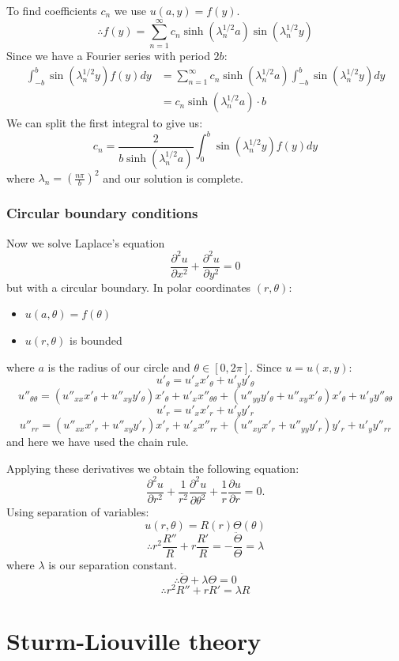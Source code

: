 \documentclass{article}
\begin{document}
To find coefficients $c_n$ we use $u(a,y)=f(y)$.
$$\therefore f(y)=\sum_{n=1}^{\infty}c_n\sinh(\lambda_n^{1/2} a)
\sin(\lambda_n^{1/2} y)$$
Since we have a Fourier series with period $2b$:
\begin{align*}
    \int_{-b}^{b}\sin(\lambda_n^{1/2} y)f(y)dy
    &=\sum_{n=1}^{\infty}c_n\sinh(\lambda_n^{1/2} a)
    \int_{-b}^{b}\sin(\lambda_n^{1/2} y)dy \\
    &=c_n\sinh(\lambda_n^{1/2} a)\cdot b
\end{align*}
We can split the first integral to give us:
$$c_n=\frac{2}{b\sinh(\lambda_n^{1/2} a)}
\int_{0}^{b}\sin(\lambda_n^{1/2} y)f(y)dy$$
where $\lambda_n=\left(\frac{n\pi}{b}\right)^2$
and our solution is complete.

\subsubsection{Circular boundary conditions}
Now we solve Laplace's equation
$$\frac{\partial^2 u}{\partial x^2}+\frac{\partial^2 u}{\partial y^2}=0$$
but with a circular boundary. In polar coordinates $(r,\theta)$:
\begin{itemize}
    \item $u(a,\theta)=f(\theta)$
    \item $u(r,\theta)$ is bounded
\end{itemize}
where $a$ is the radius of our circle and $\theta\in[0,2\pi]$. Since $u=u(x,y)$:
$$u'_{\theta}=u'_x x'_{\theta}+u'_y y'_{\theta}$$
$$u''_{\theta\theta}=(u''_{xx}x'_{\theta}+u''_{xy}y'_{\theta})x'_{\theta}
+u'_x x''_{\theta\theta}+(u''_{yy}y'_{\theta}+u''_{xy}x'_{\theta})x'_{\theta}+u'_y y''_{\theta\theta}$$
$$u'_r=u'_x x'_r+u'_y y'_r$$
$$u''_{rr}=(u''_{xx}x'_r+u''_{xy}y'_r)x'_r
+u'_x x''_{rr}+(u''_{xy}x'_r+u''_{yy}y'_r)y'_r+u'_y y''_{rr}$$
and here we have used the chain rule.

\newpage

Applying these derivatives we obtain the following equation:
$$\frac{\partial^2 u}{\partial r^2}+\frac{1}{r^2}\frac{\partial^2 u}{\partial\theta^2}
+\frac{1}{r}\frac{\partial u}{\partial r}=0.$$
Using separation of variables:
$$u(r,\theta)=R(r)\Theta(\theta)$$
$$\therefore r^2\frac{R''}{R}+r\frac{R'}{R}=-\frac{\ddot{\Theta}}{\Theta}=\lambda$$
where $\lambda$ is our separation constant.
$$\therefore\ddot{\Theta}+\lambda\Theta=0$$
$$\therefore r^2 R''+rR'=\lambda R$$

\newpage

\section{Sturm-Liouville theory}
\end{document}
